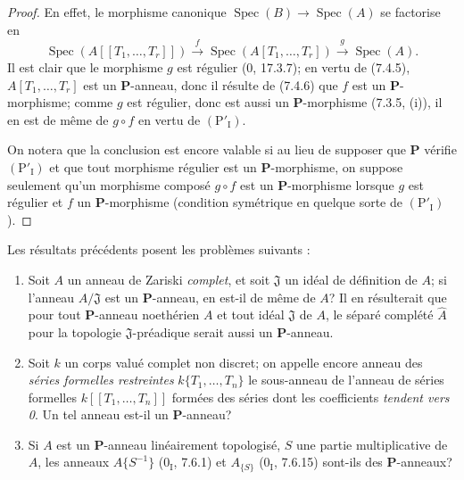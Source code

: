 \begin{proof}
En effet, le morphisme canonique
$\operatorname{Spec}(B)\to\operatorname{Spec}(A)$ se factorise en
\[
\operatorname{Spec}(A[[T_1,\ldots,T_r]])
\xrightarrow{f}\operatorname{Spec}(A[T_1,\ldots,T_r])
\xrightarrow{g}\operatorname{Spec}(A).
\]
Il est clair que le morphisme $g$ est régulier (0, 17.3.7); en vertu de
(7.4.5), $A[T_1,\ldots,T_r]$ est un $\boldsymbol P$-anneau, donc il résulte
de (7.4.6) que $f$ est un $\boldsymbol P$-morphisme; comme $g$ est régulier,
donc est aussi un $\boldsymbol P$-morphisme (7.3.5, (i)), il en est de même
de $g\circ f$ en vertu de $(\mathrm P'_{\mathrm I})$.

On notera que la conclusion est encore valable si au lieu de supposer que
$\boldsymbol P$ vérifie $(\mathrm P'_{\mathrm I})$ et que tout morphisme
régulier est un $\boldsymbol P$-morphisme, on suppose seulement qu'un
morphisme composé $g\circ f$ est un $\boldsymbol P$-morphisme lorsque $g$
est régulier et $f$ un $\boldsymbol P$-morphisme (condition symétrique en
quelque sorte de $(\mathrm P'_{\mathrm I})$).
\end{proof}

\begin{remark}[7.4.8]
\label{IV.2.s7.4.8-fr}
Les résultats précédents posent les problèmes suivants :
\begin{enumerate}
\item[\emph{A)}] Soit $A$ un anneau de Zariski \emph{complet}, et soit
$\mathfrak J$ un idéal de définition de $A$; si l'anneau $A/\mathfrak J$
est un $\boldsymbol P$-anneau, en est-il de même de $A$? Il en résulterait
que pour tout $\boldsymbol P$-anneau noethérien $A$ et tout idéal
$\mathfrak J$ de $A$, le séparé complété $\widehat A$ pour la topologie
$\mathfrak J$-préadique serait aussi un $\boldsymbol P$-anneau.
\item[\emph{B)}] Soit $k$ un corps valué complet non discret; on appelle
encore anneau des \emph{séries formelles restreintes}
$k\{T_1,\ldots,T_n\}$ le sous-anneau de l'anneau de séries formelles
$k[[T_1,\ldots,T_n]]$ formées des séries dont les coefficients \emph{tendent
vers 0}. Un tel anneau est-il un $\boldsymbol P$-anneau?
\item[\emph{C)}] Si $A$ est un $\boldsymbol P$-anneau linéairement
topologisé, $S$ une partie multiplicative de $A$, les anneaux
$A\{S^{-1}\}$ (0$_{\mathrm I}$, 7.6.1) et $A_{\{S\}}$
(0$_{\mathrm I}$, 7.6.15) sont-ils des $\boldsymbol P$-anneaux?
\end{enumerate}
\end{remark}

